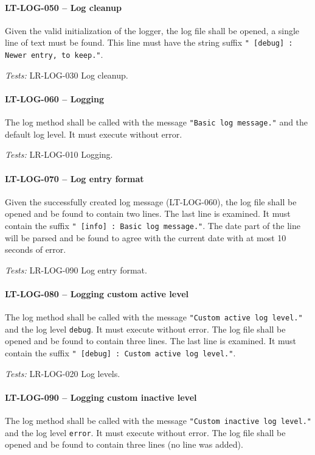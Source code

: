 \paragraph{LT-LOG-050 -- Log cleanup}
Given the valid initialization of the logger, the log file
shall be opened, a single line of text must be found.
This line must have the string suffix
\lstinline{" [debug] : Newer entry, to keep."}.

\textit{Tests: } LR-LOG-030 Log cleanup.

\paragraph{LT-LOG-060 -- Logging}
The log method shall be called with the message
\lstinline{"Basic log message."} and the default log level.
It must execute without error.

\textit{Tests: } LR-LOG-010 Logging.

\paragraph{LT-LOG-070 -- Log entry format}
Given the successfully created log message (LT-LOG-060),
the log file shall be opened and be found to contain two lines.
The last line is examined. It must contain the suffix
\lstinline{" [info] : Basic log message."}.
The date part of the line will be parsed and be found to agree
with the current date with at most 10 seconds of error.

\textit{Tests: } LR-LOG-090 Log entry format.

\paragraph{LT-LOG-080 -- Logging custom active level}
The log method shall be called with the message
\lstinline{"Custom active log level."} and the log level
\lstinline{debug}. It must execute without error.
The log file shall be opened and be found to contain three lines.
The last line is examined. It must contain the suffix
\lstinline{" [debug] : Custom active log level."}.

\textit{Tests: } LR-LOG-020 Log levels.

\paragraph{LT-LOG-090 -- Logging custom inactive level}
The log method shall be called with the message
\lstinline{"Custom inactive log level."} and the log level
\lstinline{error}. It must execute without error.
The log file shall be opened and be found to contain three lines
(no line was added).

